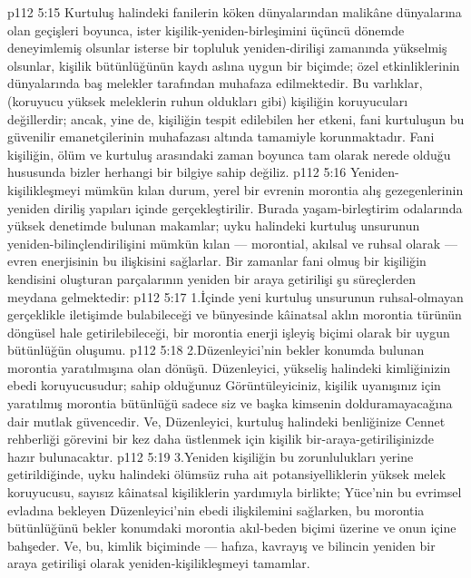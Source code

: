 \vs p112 5:15 Kurtuluş halindeki fanilerin köken dünyalarından malikâne dünyalarına olan geçişleri boyunca, ister kişilik\hyp{}yeniden\hyp{}birleşimini üçüncü dönemde deneyimlemiş olsunlar isterse bir topluluk yeniden\hyp{}dirilişi zamanında yükselmiş olsunlar, kişilik bütünlüğünün kaydı aslına uygun bir biçimde; özel etkinliklerinin dünyalarında baş melekler tarafından muhafaza edilmektedir. Bu varlıklar, (koruyucu yüksek meleklerin ruhun oldukları gibi) kişiliğin koruyucuları değillerdir; ancak, yine de, kişiliğin tespit edilebilen her etkeni, fani kurtuluşun bu güvenilir emanetçilerinin muhafazası altında tamamiyle korunmaktadır. Fani kişiliğin, ölüm ve kurtuluş arasındaki zaman boyunca tam olarak nerede olduğu hususunda bizler herhangi bir bilgiye sahip değiliz.
\vs p112 5:16 Yeniden\hyp{}kişilikleşmeyi mümkün kılan durum, yerel bir evrenin morontia alış gezegenlerinin yeniden diriliş yapıları içinde gerçekleştirilir. Burada yaşam\hyp{}birleştirim odalarında yüksek denetimde bulunan makamlar; uyku halindeki kurtuluş unsurunun yeniden\hyp{}bilinçlendirilişini mümkün kılan --- morontial, akılsal ve ruhsal olarak --- evren enerjisinin bu ilişkisini sağlarlar. Bir zamanlar fani olmuş bir kişiliğin kendisini oluşturan parçalarının yeniden bir araya getirilişi şu süreçlerden meydana gelmektedir:
\vs p112 5:17 1.\bibnobreakspace İçinde yeni kurtuluş unsurunun ruhsal\hyp{}olmayan gerçeklikle iletişimde bulabileceği ve bünyesinde kâinatsal aklın morontia türünün döngüsel hale getirilebileceği, bir morontia enerji işleyiş biçimi olarak bir uygun bütünlüğün oluşumu.
\vs p112 5:18 2.\bibnobreakspace Düzenleyici’nin bekler konumda bulunan morontia yaratılmışına olan dönüşü. Düzenleyici, yükseliş halindeki kimliğinizin ebedi koruyucusudur; sahip olduğunuz Görüntüleyiciniz, kişilik uyanışınız için yaratılmış morontia bütünlüğü sadece siz ve başka kimsenin dolduramayacağına dair mutlak güvencedir. Ve, Düzenleyici, kurtuluş halindeki benliğinize Cennet rehberliği görevini bir kez daha üstlenmek için kişilik bir\hyp{}araya\hyp{}getirilişinizde hazır bulunacaktır.
\vs p112 5:19 3.\bibnobreakspace Yeniden kişiliğin bu zorunlulukları yerine getirildiğinde, uyku halindeki ölümsüz ruha ait potansiyelliklerin yüksek melek koruyucusu, sayısız kâinatsal kişiliklerin yardımıyla birlikte; Yüce’nin bu evrimsel evladına bekleyen Düzenleyici’nin ebedi ilişkilemini sağlarken, bu morontia bütünlüğünü bekler konumdaki morontia akıl\hyp{}beden biçimi üzerine ve onun içine bahşeder. Ve, bu, kimlik biçiminde --- hafıza, kavrayış ve bilincin yeniden bir araya getirilişi olarak yeniden\hyp{}kişilikleşmeyi tamamlar.
